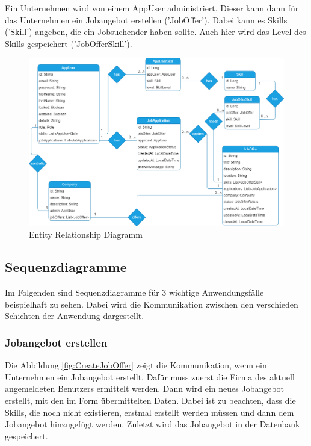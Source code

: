 \documentclass[12pt, letterpaper]{article}
\begin{document}
    Ein Unternehmen wird von einem AppUser administriert. Dieser kann dann für das Unternehmen ein Jobangebot erstellen ('JobOffer'). Dabei kann es Skills ('Skill') angeben, die ein Jobsuchender
    haben sollte. Auch hier wird das Level des Skills gespeichert ('JobOfferSkill').
    \\[4mm]
    \begin{figure}[htbp]
        \includegraphics[width = \linewidth]{ERM.png}
        \caption{Entity Relationship Diagramm}
        \label{fig:ERM}
    \end{figure}
    

    \subsection{Sequenzdiagramme}
    
    Im Folgenden sind Sequenzdiagramme für 3 wichtige Anwendungsfälle beispielhaft zu sehen. Dabei wird die Kommunikation zwischen
    den verschieden Schichten der Anwendung dargestellt.

    \subsubsection{Jobangebot erstellen}

    Die Abbildung \ref{fig:CreateJobOffer} zeigt die Kommunikation, wenn ein Unternehmen ein Jobangebot erstellt. Dafür muss zuerst
    die Firma des aktuell angemeldeten Benutzers ermittelt werden. Dann wird ein neues Jobangebot erstellt, mit den im Form
    übermittelten Daten. Dabei ist zu beachten, dass die Skills, die noch nicht existieren, erstmal erstellt werden müssen
    und dann dem Jobangebot hinzugefügt werden. Zuletzt wird das Jobangebot in der Datenbank gespeichert.
\end{document}
